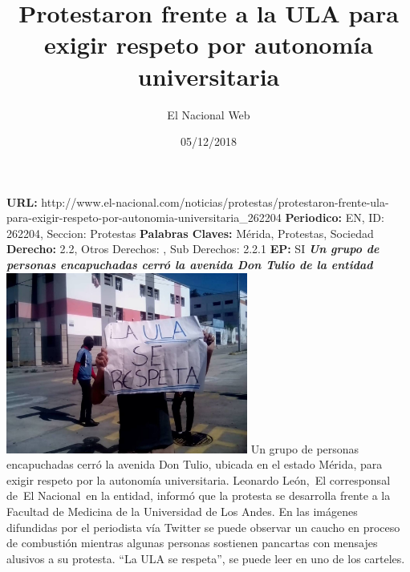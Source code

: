 \documentclass{article}%
\title{\textbf{Protestaron frente a la ULA para exigir respeto por autonomía universitaria}}%
\author{El Nacional Web}%
\date{05/12/2018}%
\begin{document}
%
\normalsize%
\maketitle%
\textbf{URL: }%
http://www.el{-}nacional.com/noticias/protestas/protestaron{-}frente{-}ula{-}para{-}exigir{-}respeto{-}por{-}autonomia{-}universitaria\_262204\newline%
%
\textbf{Periodico: }%
EN, %
ID: %
262204, %
Seccion: %
Protestas\newline%
%
\textbf{Palabras Claves: }%
Mérida, Protestas, Sociedad\newline%
%
\textbf{Derecho: }%
2.2, %
Otros Derechos: %
, %
Sub Derechos: %
2.2.1\newline%
%
\textbf{EP: }%
SI\newline%
\newline%
%
\textbf{\textit{Un grupo de personas encapuchadas cerró la avenida Don Tulio de la entidad}}%
\newline%
\newline%
%
\includegraphics[width=300px]{33.jpg}%
\newline%
%
Un grupo de personas encapuchadas cerró la avenida Don Tulio, ubicada en el estado Mérida, para exigir respeto por la autonomía universitaria.%
\newline%
%
Leonardo León,~El corresponsal de~El Nacional~en la entidad, informó que la protesta se desarrolla frente a la Facultad de Medicina de la Universidad de Los Andes.%
\newline%
%
En las imágenes difundidas por el periodista vía Twitter se puede observar un caucho en proceso de combustión mientras algunas personas sostienen pancartas con mensajes alusivos a su protesta.%
\newline%
%
“La ULA se respeta”, se puede leer en uno de los carteles.%
\newline%
%
\end{document}
